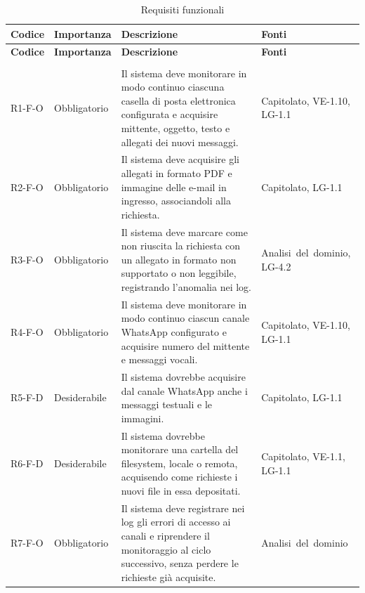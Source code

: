 {
    \small
    \renewcommand{\arraystretch}{1.3}
    \begin{longtable}{|>{\raggedright\arraybackslash}p{1.8cm}|>{\raggedright\arraybackslash}p{2.3cm}|>{\raggedright\arraybackslash}p{6.6cm}|>{\raggedright\arraybackslash}p{3.1cm}|}
    \caption{Requisiti funzionali}\label{tab:req-funzionali}\\
    \hline
    \rowcolor[gray]{0.88} \textbf{Codice} & \textbf{Importanza} & \textbf{Descrizione} & \textbf{Fonti} \\ \hline
    \endfirsthead
    \hline
    \rowcolor[gray]{0.88} \textbf{Codice} & \textbf{Importanza} & \textbf{Descrizione} & \textbf{Fonti} \\ \hline
    \endhead
    \multicolumn{4}{|l|}{\cellcolor[gray]{0.94}\textbf{Macroarea 1 --- Acquisizione delle richieste dai canali}} \\ \hline
    \mbox{R1-F-O} & Obbligatorio & Il sistema deve monitorare in modo continuo ciascuna casella di posta elettronica configurata e acquisire mittente, oggetto, testo e allegati dei nuovi messaggi. & \mbox{Capitolato}, \mbox{VE-1.10}, \mbox{LG-1.1} \\ \hline
    \mbox{R2-F-O} & Obbligatorio & Il sistema deve acquisire gli allegati in formato PDF e immagine delle e-mail in ingresso, associandoli alla richiesta. & \mbox{Capitolato}, \mbox{LG-1.1} \\ \hline
    \mbox{R3-F-O} & Obbligatorio & Il sistema deve marcare come non riuscita la richiesta con un allegato in formato non supportato o non leggibile, registrando l'anomalia nei log. & \mbox{Analisi del dominio}, \mbox{LG-4.2} \\ \hline
    \mbox{R4-F-O} & Obbligatorio & Il sistema deve monitorare in modo continuo ciascun canale WhatsApp configurato e acquisire numero del mittente e messaggi vocali. & \mbox{Capitolato}, \mbox{VE-1.10}, \mbox{LG-1.1} \\ \hline
    \mbox{R5-F-D} & Desiderabile & Il sistema dovrebbe acquisire dal canale WhatsApp anche i messaggi testuali e le immagini. & \mbox{Capitolato}, \mbox{LG-1.1} \\ \hline
    \mbox{R6-F-D} & Desiderabile & Il sistema dovrebbe monitorare una cartella del filesystem, locale o remota, acquisendo come richieste i nuovi file in essa depositati. & \mbox{Capitolato}, \mbox{VE-1.1}, \mbox{LG-1.1} \\ \hline
    \mbox{R7-F-O} & Obbligatorio & Il sistema deve registrare nei log gli errori di accesso ai canali e riprendere il monitoraggio al ciclo successivo, senza perdere le richieste già acquisite. & \mbox{Analisi del dominio} \\ \hline

\end{longtable}}
